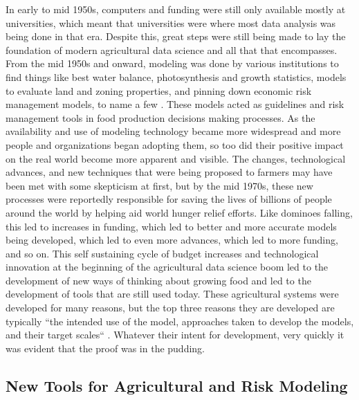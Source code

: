 \documentclass[sigconf]{acmart}
\begin{document}
In early to mid 1950s, computers and funding were still only available mostly at universities, which meant that universities were where most data analysis was being done in that era. Despite this, great steps were still being made to lay the foundation of modern agricultural data science and all that that encompasses. From the mid 1950s and onward, modeling was done by various institutions to find things like best water balance, photosynthesis and growth statistics, models to evaluate land and zoning properties, and pinning down economic risk management models, to name a few \cite{jones2017}. These models acted as guidelines and risk management tools in food production decisions making processes. As the availability and use of modeling technology became more widespread and more people and organizations began adopting them, so too did their positive impact on the real world become more apparent and visible. The changes, technological advances, and new techniques that were being proposed to farmers may have been met with some skepticism at first, but by the mid 1970s, these new processes were reportedly responsible for saving the lives of billions of people around the world by helping aid world hunger relief efforts. Like dominoes falling, this led to increases in funding, which led to better and more accurate models being developed, which led to even more advances, which led to more funding, and so on. This self sustaining cycle of budget increases and technological innovation at the beginning of the agricultural data science boom led to the development of new ways of thinking about growing food and led to the development of tools that are still used today. These agricultural systems were developed for many reasons, but the top three reasons they are developed are typically ``the intended use of the model, approaches taken to develop the models, and their target scales`` \cite{jones2017}. Whatever their intent for development, very quickly it was evident that the proof was in the pudding.

\subsection{New Tools for Agricultural and Risk Modeling}
\end{document}
